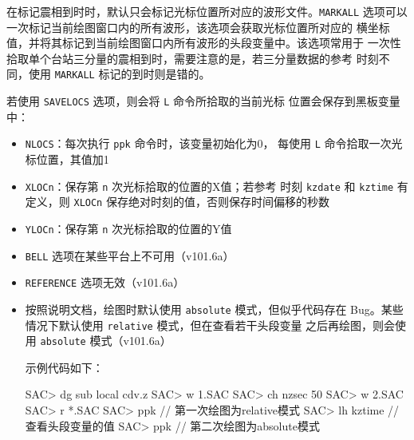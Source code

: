 在标记震相到时时，默认只会标记光标位置所对应的波形文件。\texttt{MARKALL}
选项可以一次标记当前绘图窗口内的所有波形，该选项会获取光标位置所对应的
横坐标值，并将其标记到当前绘图窗口内所有波形的头段变量中。该选项常用于
一次性拾取单个台站三分量的震相到时，需要注意的是，若三分量数据的参考
时刻不同，使用 \texttt{MARKALL} 标记的到时则是错的。

若使用 \texttt{SAVELOCS} 选项，则会将 \texttt{L} 命令所拾取的当前光标
位置会保存到黑板变量中：
\begin{itemize}
\item \texttt{NLOCS}：每次执行 \texttt{ppk} 命令时，该变量初始化为0，
    每使用 \texttt{L} 命令拾取一次光标位置，其值加1
\item \texttt{XLOCn}：保存第 \texttt{n} 次光标拾取的位置的X值；若参考
    时刻 \texttt{kzdate} 和 \texttt{kztime} 有定义，则 \texttt{XLOCn}
    保存绝对时刻的值，否则保存时间偏移的秒数
\item \texttt{YLOCn}：保存第 \texttt{n} 次光标拾取的位置的Y值
\end{itemize}

\begin{itemize}
\item \texttt{BELL} 选项在某些平台上不可用（v101.6a）
\item \texttt{REFERENCE} 选项无效（v101.6a）
\item 按照说明文档，绘图时默认使用 \texttt{absolute} 模式，但似乎代码存在
    Bug。某些情况下默认使用 \texttt{relative} 模式，但在查看若干头段变量
    之后再绘图，则会使用 \texttt{absolute} 模式（v101.6a）

示例代码如下：
\begin{SACCode}
SAC> dg sub local cdv.z
SAC> w 1.SAC
SAC> ch nzsec 50
SAC> w 2.SAC
SAC> r *.SAC
SAC> ppk            // 第一次绘图为relative模式
SAC> lh kztime      // 查看头段变量的值
SAC> ppk            // 第二次绘图为absolute模式
\end{SACCode}
\end{itemize}
